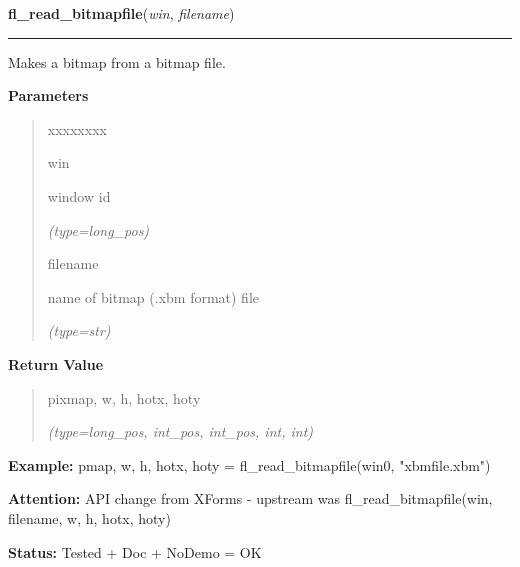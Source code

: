 \hspace{.8\funcindent}\begin{boxedminipage}{\funcwidth}

    \raggedright \textbf{fl\_read\_bitmapfile}(\textit{win}, \textit{filename})

    \vspace{-1.5ex}

    \rule{\textwidth}{0.5\fboxrule}
\setlength{\parskip}{2ex}
    Makes a bitmap from a bitmap file.

\setlength{\parskip}{1ex}
      \textbf{Parameters}
      \vspace{-1ex}

      \begin{quote}
        \begin{Ventry}{xxxxxxxx}

          \item[win]

          window id

            {\it (type=long\_pos)}

          \item[filename]

          name of bitmap (.xbm format) file

            {\it (type=str)}

        \end{Ventry}

      \end{quote}

      \textbf{Return Value}
    \vspace{-1ex}

      \begin{quote}
      pixmap, w, h, hotx, hoty

      {\it (type=long\_pos, int\_pos, int\_pos, int, int)}

      \end{quote}

\textbf{Example:} pmap, w, h, hotx, hoty = fl\_read\_bitmapfile(win0, "xbmfile.xbm")



\textbf{Attention:} API change from XForms - upstream was fl\_read\_bitmapfile(win, filename, 
w, h, hotx, hoty)



\textbf{Status:} Tested + Doc + NoDemo = OK



    \end{boxedminipage}

